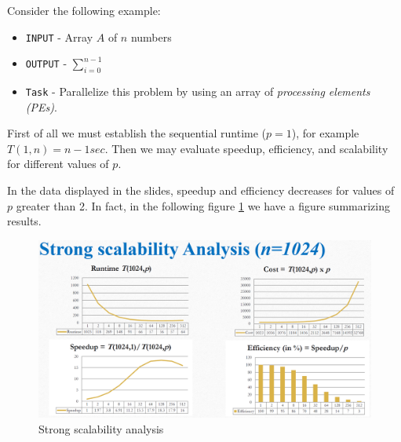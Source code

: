 Consider the following example:
\begin{itemize}
   \item \texttt{INPUT} - Array $A$ of $n$ numbers
   \item \texttt{OUTPUT} - $\sum_{i=0}^{n-1}$
   \item \texttt{Task} - Parallelize this problem by using an array of \textit{processing elements (PEs)}.
\end{itemize}


First of all we must establish the sequential runtime ($p=1$), for example $T(1,n) = n-1 sec$.
Then we may evaluate speedup, efficiency, and scalability for different values of $p$.

In the data displayed in the slides, speedup and efficiency decreases for values of $p$ greater than 2. In fact, in the following figure \ref{fig:06/scalability_analysis} we have a figure summarizing results.

\begin{figure}[htbp]
   \centering
   \includegraphics{images/06/scalability_analysis.png}
   \caption{Strong scalability analysis}
   \label{fig:06/scalability_analysis}
\end{figure}

